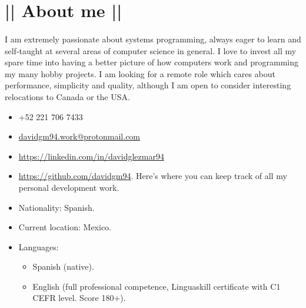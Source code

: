 \section*{|| About me ||}
\paragraph{}I am extremely passionate about systems programming, always eager to learn and self-taught at several areas of computer science in general. I love to invest all my spare time into having a better picture of how computers work and programming my many hobby projects. I am looking for a remote role which cares about performance, simplicity and quality, although I am open to consider interesting relocations to Canada or the USA.

\begin{itemize}
	\item[] \faPhone \space +52 221 706 7433
	\item[] \faMailReply \space \href{mailto:davidgm94.work@protonmail.com}{davidgm94.work@protonmail.com}
	\item[] \faLinkedin \space \href{https://linkedin.com/in/davidglezmar94}{https://linkedin.com/in/davidglezmar94}
	\item[] \faGithub \space \href{https://github.com/davidgm94}{https://github.com/davidgm94}. Here's where you can keep track of all my personal development work.
	\item[] Nationality: Spanish.
	\item[] Current location: Mexico.
	\item[] Languages:
	\begin{itemize}
		\item Spanish (native).
		\item English (full professional competence, Linguaskill certificate with C1 CEFR level. Score 180+).
	\end{itemize}
\end{itemize}